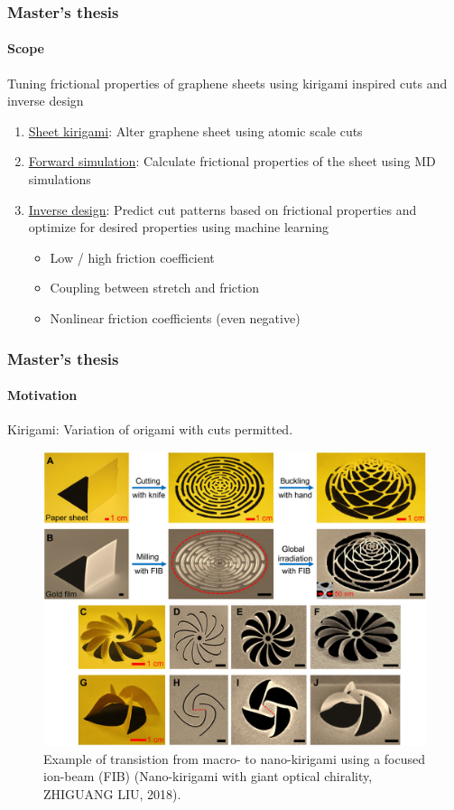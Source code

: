 \documentclass[
	10pt, %
]{beamer}
\begin{document}
\begin{frame}
	\frametitle{Master's thesis}
	\framesubtitle{Scope}

 
	{\large Tuning frictional properties of graphene sheets using kirigami inspired cuts and inverse design}
	\newline
	


	\begin{enumerate}
		\setlength\itemsep{2em}
		\item \underline{Sheet kirigami}: Alter graphene sheet using atomic scale cuts %
		\item \underline{Forward simulation}: Calculate frictional properties of the sheet using MD simulations
		\item \underline{Inverse design}: Predict cut patterns based on frictional properties and optimize for desired properties using machine learning
		\begin{itemize}
			\item Low / high friction coefficient
			\item Coupling between stretch and friction
			\item Nonlinear friction coefficients (even negative)
		\end{itemize} 
	\end{enumerate}
\end{frame}



\begin{frame}
	\frametitle{Master's thesis}
	\framesubtitle{Motivation}

	Kirigami: Variation of origami with cuts permitted.

	\begin{figure}
		\includegraphics[width=0.6\linewidth]{figures/kirigami_example.jpeg}
		\caption{Example of transistion from macro- to nano-kirigami using a focused ion-beam (FIB) (Nano-kirigami with giant optical chirality, ZHIGUANG LIU, 2018).}
	\end{figure}	

\end{frame}
\end{document}
